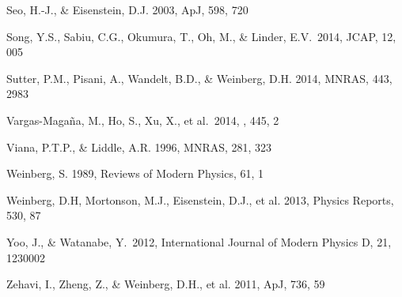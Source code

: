 \documentclass[iop]{emulateapj}
\begin{document}
\begin{thebibliography}{}
Seo, H.-J., \& Eisenstein, D.J. 2003, ApJ, 598, 720



Song, Y.S., Sabiu, C.G., 
Okumura, T., Oh, M., \& Linder, E.V.\ 2014, JCAP, 12, 005 

Sutter, P.M., Pisani, A., Wandelt, B.D., \& Weinberg, D.H. 2014, MNRAS, 443, 2983




 Vargas-Maga{\~n}a, M., Ho, S., Xu, X., et al.\ 2014, \mnras, 445, 2 

Viana, P.T.P., \& Liddle, A.R. 1996, MNRAS, 281, 323



Weinberg, S. 1989, Reviews of Modern Physics, 61, 1

Weinberg, D.H, Mortonson, M.J., Eisenstein, D.J., et al. 2013, Physics Reports, 530, 87



 Yoo, J., \& Watanabe, Y.\ 2012, International Journal of Modern Physics D, 21, 1230002 


Zehavi, I., Zheng, Z., \& Weinberg, D.H., et al. 2011, ApJ, 736, 59




\end{thebibliography}
\end{document}
